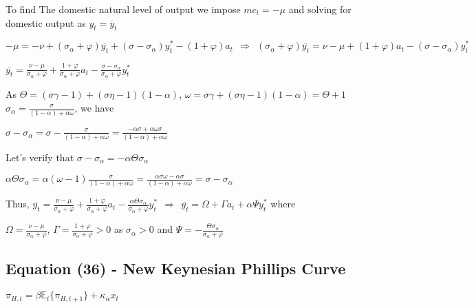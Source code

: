 \documentclass[
]{article}
\begin{document}
To find The domestic natural level of output we impose \(mc_t=-\mu\) and
solving for domestic output as \(y_t= \overline{y}_t\)

\(-\mu = -\nu + (\sigma_\alpha+\varphi)\overline{y_t} + (\sigma-\sigma_\alpha)y_t^*-(1+\varphi)a_t \ \ \Rightarrow \ \ (\sigma_\alpha+\varphi)\overline{y_t} = \nu -\mu +(1+\varphi)a_t - (\sigma-\sigma_\alpha)y_t^*\)

\(\displaystyle \overline{y_t} = \frac{\nu -\mu}{\sigma_\alpha+\varphi} + \frac{1+\varphi}{\sigma_\alpha+\varphi}a_t - \frac{\sigma-\sigma_\alpha}{\sigma_\alpha+\varphi}y_t^*\)

As \(\Theta = (\sigma \gamma-1)+(\sigma \eta-1)(1-\alpha)\),
\(\omega=\sigma \gamma+(\sigma \eta-1)(1-\alpha)=\Theta+1\)
\(\displaystyle \sigma_\alpha = \frac{\sigma}{(1-\alpha)+\alpha \omega}\),
we have

\(\displaystyle \sigma-\sigma_\alpha=\sigma- \frac{\sigma}{(1-\alpha)+\alpha \omega}=\frac{-\alpha \sigma +\alpha \omega\sigma}{(1-\alpha)+\alpha \omega}\)

Let's verify that
\(\sigma-\sigma_\alpha = - \alpha \Theta \sigma_\alpha\)

\(\displaystyle \alpha \Theta \sigma_\alpha= \alpha (\omega-1) \frac{\sigma}{(1-\alpha)+\alpha \omega} = \frac{\alpha \sigma \omega -\alpha \sigma}{(1-\alpha)+\alpha \omega}=\sigma-\sigma_\alpha\)

Thus,
\(\displaystyle \overline{y_t} = \frac{\nu -\mu}{\sigma_\alpha+\varphi} + \frac{1+\varphi}{\sigma_\alpha+\varphi}a_t - \frac{ \alpha \Theta \sigma_\alpha}{\sigma_\alpha+\varphi}y_t^* \ \ \Rightarrow \ \ \overline{y_t} =\Omega+\Gamma a_t+ \alpha \Psi y_t^*\)
where

\(\displaystyle \Omega = \frac{\nu -\mu}{\sigma_\alpha+\varphi}\),
\(\displaystyle \Gamma = \frac{1+\varphi}{\sigma_\alpha+\varphi}>0\) as
\(\sigma_\alpha>0\) and
\(\displaystyle \Psi=-\frac{\Theta \sigma_\alpha}{\sigma_\alpha + \varphi}\)

\vspace{12pt}

\hypertarget{equation-36---new-keynesian-phillips-curve}{%
\subsection{Equation (36) - New Keynesian Phillips
Curve}\label{equation-36---new-keynesian-phillips-curve}}

\(\pi_{H,t} = \beta \mathbb{E}_t \{ \pi_{H,t+1}\} + \kappa_\alpha x_t\)
\end{document}
